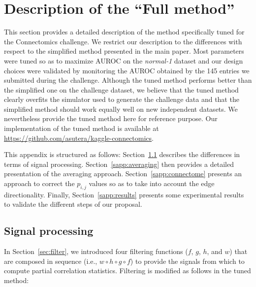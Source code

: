\documentclass[wcp]{jmlr}
\begin{document}
\newpage
\clearpage



\newpage
\clearpage

\appendix


\section{Description  of the ``Full method''}
\label{app:optimized}

This section provides a detailed description of the method specifically tuned
for the Connectomics challenge. We restrict our description to the
differences with respect to the simplified method presented in the main
paper. Most parameters were tuned so as to maximize AUROC on the
\textit{normal-1} dataset and our design choices were validated by monitoring
the AUROC obtained by the 145 entries we submitted during the
challenge. Although the tuned method performs better than the simplified one on
the challenge dataset, we believe that the tuned method clearly overfits the
simulator used to generate the challenge data and that the simplified method
should work equally well on new independent datasets. We nevertheless provide
the tuned method here for reference purpose. Our implementation of the tuned
method is available at \url{https://github.com/asutera/kaggle-connectomics}.

This appendix is structured as follows: Section~\ref{sapp:signal} describes
the differences in terms of signal processing. Section~\ref{sapp:averaging}
then provides a detailed presentation of the averaging approach.
Section~\ref{sapp:connectome} presents an approach to correct the $p_{i,j}$
values so as to take into account the edge directionality. Finally,
Section~\ref{sapp:results} presents some experimental results to validate the
different steps of our proposal.

\subsection{Signal processing}
\label{sapp:signal}

In Section~\ref{sec:filter}, we introduced four filtering functions ($f$, $g$,
$h$, and $w$) that are composed in sequence (i.e., $w \circ h \circ g \circ
f$) to provide the signals from which to compute partial correlation
statistics. Filtering is modified as follows in the tuned method:
\end{document}
